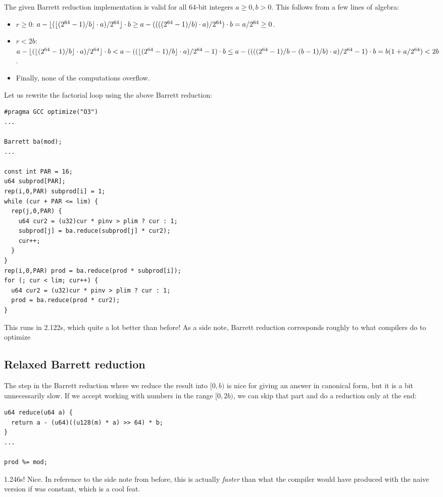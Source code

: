 The given Barrett reduction implementation is valid for all 64-bit integers $a \ge 0, b > 0$. This follows from a few lines of algebra:
\begin{itemize}
\item $r \ge 0$: $a - \lfloor(\lfloor (2^{64} - 1) / b\rfloor \cdot a)/2^{64}\rfloor \cdot b \ge a - ((((2^{64} - 1) / b) \cdot a)/2^{64}) \cdot b = a / 2^{64} \ge 0$.
\item $r < 2b$: $a - \lfloor(\lfloor (2^{64} - 1) / b\rfloor \cdot a)/2^{64}\rfloor \cdot b < a - ((\lfloor (2^{64} - 1) / b\rfloor \cdot a)/2^{64} - 1) \cdot b \le a - ((((2^{64} - 1) / b - (b - 1) / b) \cdot a)/2^{64} - 1) \cdot b = b (1 + a/2^{64}) < 2b$.
\item Finally, none of the computations overflow.
\end{itemize}

Let us rewrite the factorial loop using the above Barrett reduction:
\begin{lstlisting}
#pragma GCC optimize("O3")
...

Barrett ba(mod);
...

const int PAR = 16;
u64 subprod[PAR];
rep(i,0,PAR) subprod[i] = 1;
while (cur + PAR <= lim) {
  rep(j,0,PAR) {
    u64 cur2 = (u32)cur * pinv > plim ? cur : 1;
    subprod[j] = ba.reduce(subprod[j] * cur2);
    cur++;
  }
}
rep(i,0,PAR) prod = ba.reduce(prod * subprod[i]);
for (; cur < lim; cur++) {
  u64 cur2 = (u32)cur * pinv > plim ? cur : 1;
  prod = ba.reduce(prod * cur2);
}
\end{lstlisting}
This runs in 2.122s, which quite a lot better than before!
As a side note, Barrett reduction corresponds roughly to what compilers do to optimize \verb@a % b@ where \verb@b@ is a compile-time constant.

\subsection{Relaxed Barrett reduction}
The step in the Barrett reduction where we reduce the result into $[0, b)$ is nice for giving an answer in canonical form, but it is a bit unnecessarily slow.
If we accept working with numbers in the range $[0, 2b)$, we can skip that part and do a reduction only at the end:
\begin{lstlisting}
u64 reduce(u64 a) {
  return a - (u64)((u128(m) * a) >> 64) * b;
}
...

prod %= mod;
\end{lstlisting}
1.246s! Nice.
In reference to the side note from before, this is actually \emph{faster} than what the compiler would have produced with the naive version if \verb@mod@ was constant, which is a cool feat.

